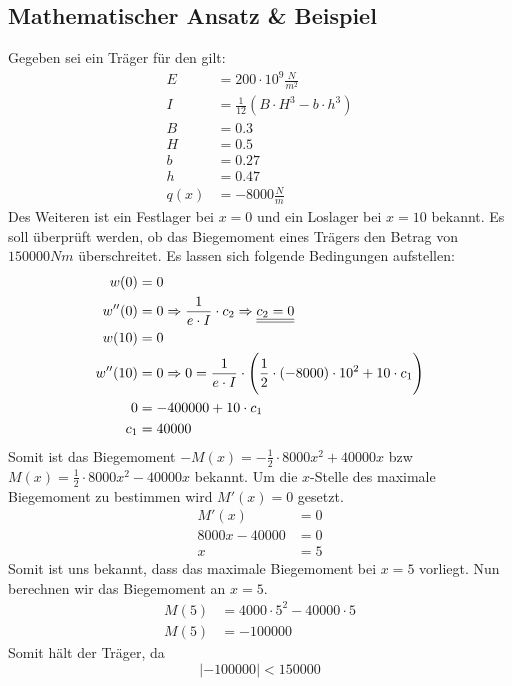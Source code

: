 \documentclass[a4paper,12pt]{article}
\begin{document}
\subsection{Mathematischer Ansatz \& Beispiel}
Gegeben sei ein Träger für den gilt:
\begin{equation}
\begin{split}
E & = 200 \cdot 10^9 \frac{N}{m^2}\\
I & = \frac{1}{12}(B \cdot H^3 - b \cdot h^3)\\
B & = 0.3\\
H & = 0.5\\
b & = 0.27\\
h & = 0.47\\
q(x) & = -8000 \frac{N}{m}
\end{split}
\end{equation}
Des Weiteren ist ein Festlager bei $x = 0$ und ein Loslager bei $x = 10$ bekannt.
Es soll überprüft werden, ob das Biegemoment eines Trägers den Betrag von $150000 Nm$ überschreitet.
Es lassen sich folgende Bedingungen aufstellen:
\begin{equation}
\begin{split}
w(0) & = 0\\
w''(0) & = 0 \Rightarrow \frac{1}{e \cdot I} \cdot c_2 \Rightarrow \underline{\underline{c_2 = 0}}\\
w(10) & = 0\\
w''(10) & = 0 \Rightarrow 0 = \frac{1}{e \cdot I} \cdot \Bigg{(}\frac{1}{2} \cdot (-8000) \cdot 10^2 + 10 \cdot c_1\Bigg{)}\\
0 & = -400000 + 10 \cdot c_1\\
c_1 & = 40000
\end{split}
\end{equation}
Somit ist das Biegemoment $- M(x) = - \frac{1}{2} \cdot 8000x^2 + 40000x$ bzw $M(x) = \frac{1}{2} \cdot 8000x^2 - 40000x$ bekannt.
Um die $x$-Stelle des maximale Biegemoment zu bestimmen wird $M'(x) = 0$ gesetzt.
\begin{equation}
\begin{split}
M'(x) & = 0\\
8000x - 40000 & = 0\\
x & = 5
\end{split}
\end{equation}
Somit ist uns bekannt, dass das maximale Biegemoment bei $x = 5$ vorliegt.
Nun berechnen wir das Biegemoment an $x = 5$.
\begin{equation}
\begin{split}
M(5) & = 4000 \cdot 5^2 - 40000 \cdot 5\\
M(5) & = -100000
\end{split}
\end{equation}
Somit hält der Träger, da
$$|-100000| < 150000$$
\end{document}
